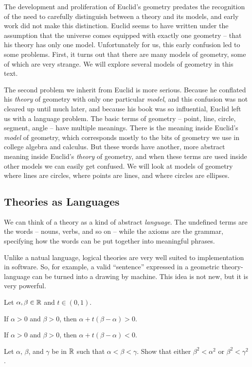 The development and proliferation of Euclid's geometry predates the recognition of the need to carefully distinguish between a theory and its models, and early work did not make this distinction.
Euclid seems to have written under the assumption that the universe comes equipped with exactly one geometry -- that his theory has only one model.
Unfortunately for us, this early confusion led to some problems.
First, it turns out that there are many models of geometry, some of which are very strange.
We will explore several models of geometry in this text.

The second problem we inherit from Euclid is more serious.
Because he conflated his \emph{theory} of geometry with only one particular \emph{model}, and this confusion was not cleared up until much later, and because his book was so influential, Euclid left us with a language problem.
The basic terms of geometry -- point, line, circle, segment, angle -- have multiple meanings.
There is the meaning inside Euclid's \emph{model} of geometry, which corresponds mostly to the bits of geometry we use in college algebra and calculus.
But these words have another, more abstract meaning inside Euclid's \emph{theory} of geometry, and when these terms are used inside other models we can easily get confused.
We will look at models of geometry where lines are circles, where points are lines, and where circles are ellipses.

\subsection*{Theories as Languages}

We can think of a theory as a kind of abstract \emph{language}.
The undefined terms are the words -- nouns, verbs, and so on -- while the axioms are the grammar, specifying how the words can be put together into meaningful phrases.

Unlike a natual language, logical theories are very well suited to implementation in software.
So, for example, a valid ``sentence'' expressed in a geometric theory-language can be turned into a drawing by machine.
This idea is not new, but it is very powerful.



\Exercises%

\begin{exercise}\label{exerc:rr-between-sign}
Let \(\alpha, \beta \in \mathbb{R}\) and \(t \in (0,1)\).
\begin{proplist}
\item If \(\alpha > 0\) and \(\beta > 0\), then \(\alpha + t(\beta - \alpha) > 0\).
\item If \(\alpha > 0\) and \(\beta > 0\), then \(\alpha + t(\beta - \alpha) < 0\).
\end{proplist}
\end{exercise}


\begin{exercise}\label{exerc:rr-between-square}
Let \(\alpha\), \(\beta\), and \(\gamma\) be in \(\mathbb{R}\) such that \(\alpha < \beta < \gamma\).
Show that either \(\beta^2 < \alpha^2\) or \(\beta^2 < \gamma^2\).
\end{exercise}
